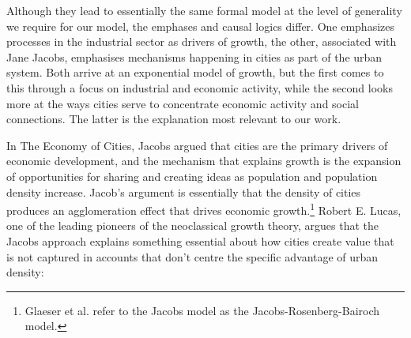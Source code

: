 {%


Although they lead to essentially the same formal model at the level of generality we require for our model, %
the emphases and causal logics differ. One emphasizes processes in the industrial sector as drivers of growth, the other, associated with Jane Jacobs, emphasises mechanisms happening in cities as part of the urban system. %
Both arrive at an exponential model of growth, but the first comes to this through a focus on industrial and economic activity, while the second looks more at the ways cities serve to concentrate economic activity and social connections. The latter is the explanation most relevant to our work.

In The Economy of Cities, Jacobs \cite{jacobsEconomyCities1969} argued that %
cities are the primary drivers of economic development, and the mechanism that explains growth is the expansion of opportunities for sharing and creating ideas as population and population density increase. Jacob's argument is essentially that the density of cities produces an agglomeration effect that drives economic growth.\footnote{Glaeser et al. \cite{glaeserGrowthCities1991} refer to the Jacobs model as the Jacobs-Rosenberg-Bairoch \cite{bairochCitiesEconomicDevelopment1988, rosenbergTechnologicalChangeMachine1963} model.} %
Robert E. Lucas, one of the leading pioneers of the neoclassical growth theory, argues that the Jacobs approach explains something essential about how cities create value that is not captured in accounts that don't centre the specific advantage of urban density: %

}
